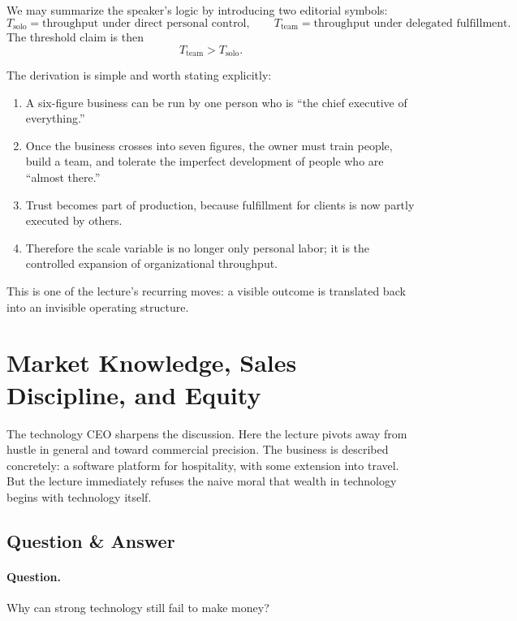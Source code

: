 We may summarize the speaker's logic by introducing two editorial symbols:
\[
T_{\text{solo}} = \text{throughput under direct personal control},
\qquad
T_{\text{team}} = \text{throughput under delegated fulfillment}.
\]
The threshold claim is then
\begin{equation}
T_{\text{team}} > T_{\text{solo}}.
\end{equation}

The derivation is simple and worth stating explicitly:
\begin{enumerate}
\item A six-figure business can be run by one person who is ``the chief executive of everything.''
\item Once the business crosses into seven figures, the owner must train people, build a team, and tolerate the imperfect development of people who are ``almost there.''
\item Trust becomes part of production, because fulfillment for clients is now partly executed by others.
\item Therefore the scale variable is no longer only personal labor; it is the controlled expansion of organizational throughput.
\end{enumerate}

This is one of the lecture's recurring moves: a visible outcome is translated back into an invisible operating structure.

\section{Market Knowledge, Sales Discipline, and Equity}

The technology CEO sharpens the discussion. Here the lecture pivots away from hustle in general and toward commercial precision. The business is described concretely: a software platform for hospitality, with some extension into travel. But the lecture immediately refuses the naive moral that wealth in technology begins with technology itself.

\subsection{Question \& Answer}

\paragraph{Question.} Why can strong technology still fail to make money?

